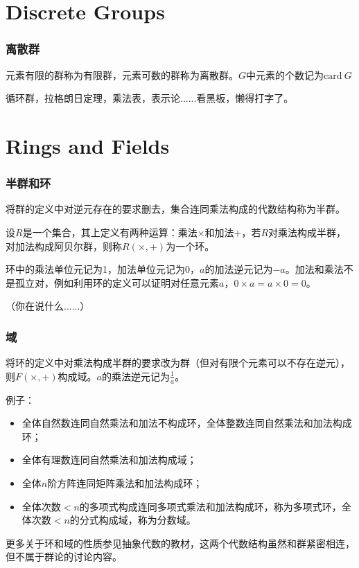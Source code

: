 \documentclass[CJK]{beamer}
\newcommand{\card}{\mathrm{card \ }}
\begin{document}
\section{Discrete Groups}
\begin{frame}
\frametitle{\bch 离散群 \ech}
\bch
元素有限的群称为有限群，元素可数的群称为离散群。$G$中元素的个数记为$\card G$\par
循环群，拉格朗日定理，乘法表，表示论......看黑板，懒得打字了。


\ech
\end{frame}







\section{Rings and Fields}
\begin{frame}
\frametitle{\bch 半群和环 \ech}
\bch
将群的定义中对逆元存在的要求删去，集合连同乘法构成的代数结构称为半群。
\par
设$R$是一个集合，其上定义有两种运算：乘法$\times$和加法$+$，若$R$对乘法构成半群，对加法构成阿贝尔群，则称$R(\times,+)$为一个环。
\par
环中的乘法单位元记为1，加法单位元记为0，$a$的加法逆元记为$-a$。加法和乘法不是孤立对，例如利用环的定义可以证明对任意元素$a$，$0 \times a = a \times 0 = 0$。
\par
（你在说什么......）


\ech
\end{frame}

\begin{frame}
\frametitle{\bch 域 \ech}
\bch
将环的定义中对乘法构成半群的要求改为群（但对有限个元素可以不存在逆元），则$F(\times,+)$构成域。$a$的乘法逆元记为$\frac{1}{a}$。\par
例子：
\begin{itemize}
\item 全体自然数连同自然乘法和加法不构成环，全体整数连同自然乘法和加法构成环；
\item 全体有理数连同自然乘法和加法构成域；
\item 全体$n$阶方阵连同矩阵乘法和加法构成环；
\item 全体次数$<n$的多项式构成连同多项式乘法和加法构成环，称为多项式环，全体次数$<n$的分式构成域，称为分数域。
\end{itemize}
更多关于环和域的性质参见抽象代数的教材，这两个代数结构虽然和群紧密相连，但不属于群论的讨论内容。


\ech
\end{frame}
\end{document}
